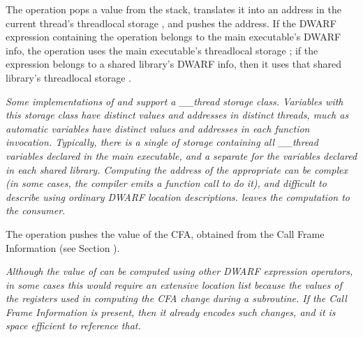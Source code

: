 \begin{enumerate}[1. ]
The  operation pops a value from the
stack, translates it into an address in the current thread's
thread\dash local storage , and pushes the address. If the
DWARF expression containing 
the 
operation belongs to the main executable's DWARF info, the
operation uses the main executable's thread\dash local storage
; if the expression belongs to a shared library's
DWARF info, then it uses that shared library's 
thread\dash local storage .

\textit{Some implementations of 
 and  support a
\_\_thread storage class. Variables with this storage class
have distinct values and addresses in distinct threads, much
as automatic variables have distinct values and addresses in
each function invocation. Typically, there is a single 
of storage containing all \_\_thread variables declared in
the main executable, and a separate  for the variables
declared in each shared library. Computing the address of
the appropriate  can be complex (in some cases, the
compiler emits a function call to do it), and difficult
to describe using ordinary DWARF location descriptions.
 leaves the computation to the
consumer.}

The  operation pushes the value of the
CFA, obtained from the Call Frame Information 
(see Section ).

\textit{Although the value of 
can be computed using other DWARF expression operators,
in some cases this would require an extensive location list
because the values of the registers used in computing the
CFA change during a subroutine. If the 
Call Frame Information 
is present, then it already encodes such changes, and it is
space efficient to reference that.}
\end{enumerate}

